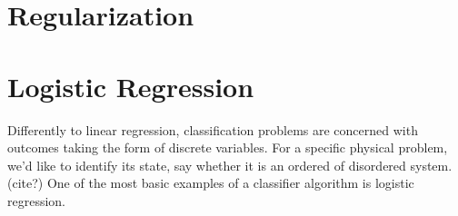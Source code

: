 \section{Regularization}\label{section:regularization}
%
%
%
%
%
%
\section{Logistic Regression}\label{seq:logistic}
Differently to linear regression, classification problems
are concerned with outcomes taking the form of discrete variables.
For a specific physical problem, we'd like to identify its state, say whether
it is an ordered of disordered system. (cite?) One of the most basic examples
of a classifier algorithm is logistic regression.

